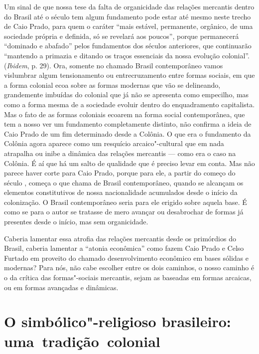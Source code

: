 Um sinal de que nossa tese da falta de organicidade das relações
mercantis dentro do Brasil até o século  tem algum fundamento pode
estar até mesmo neste trecho de Caio Prado, para quem o caráter ``mais
estável, permanente, orgânico, de uma sociedade própria e definida, só
se revelará aos poucos'', porque permanecerá ``dominado e abafado''
pelos fundamentos dos séculos anteriores, que continuarão ``mantendo a
primazia e ditando os traços essenciais da nossa evolução colonial''.
(\emph{Ibidem}, p. 29). Ora, somente no chamado Brasil
contemporâneo vamos vislumbrar algum tensionamento ou
entrecruzamento entre formas sociais, em que a forma colonial ecoa sobre
as formas modernas que vão se delineando, grandemente imbuídas do
colonial que já não se apresenta como empecilho, mas como a forma mesma de
a sociedade evoluir dentro do enquadramento capitalista. Mas o fato de as
formas coloniais ecoarem na forma social contemporânea, que tem a nosso
ver um fundamento completamente distinto, não confirma a ideia de Caio
Prado de um fim determinado desde a Colônia. O que era o fundamento da
Colônia agora aparece como um resquício arcaico"-cultural que em nada atrapalha ou
inibe a dinâmica das relações mercantis --- como era o caso na Colônia. É
aí que há um salto de qualidade que é preciso levar em conta. Mas não
parece haver corte para Caio Prado, porque para ele, a partir do começo
do século , começa o que chama de Brasil contemporâneo, quando se
alcançam os elementos constitutivos de nossa nacionalidade acumulados
desde o início da colonização. O Brasil contemporâneo seria para ele
erigido sobre aquela base. É como se para o autor se tratasse de mero
avançar ou desabrochar de formas já presentes desde o início, mas sem
organicidade.

Caberia lamentar essa atrofia das relações mercantis desde os primórdios
do Brasil, caberia lamentar a ``atonia econômica'' como fazem Caio Prado
e Celso Furtado em proveito do chamado desenvolvimento econômico em
bases sólidas e modernas? Para nós, não cabe escolher entre os dois
caminhos, o nosso caminho é o da crítica das formas"-sociais mercantis,
sejam as baseadas em formas arcaicas, ou em formas avançadas e
dinâmicas.

\section{O simbólico"-religioso brasileiro: uma~tradição~colonial}

